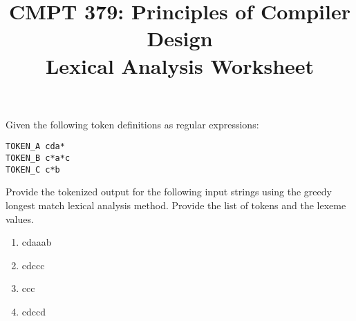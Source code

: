 \documentclass[10pt, oneside, letterpaper]{article}
\title{CMPT 379: Principles of Compiler Design \\\medskip \Large Lexical Analysis Worksheet}
\author{}
\date{}
\begin{document}
	\maketitle
	
	Given the following token definitions as regular expressions:
\begin{lstlisting}
TOKEN_A cda*
TOKEN_B c*a*c
TOKEN_C c*b
\end{lstlisting}
			
	Provide the tokenized output for the following input strings using the greedy longest match lexical analysis method. Provide the list of tokens and the lexeme values.
	
	\begin{enumerate}
		\item cdaaab
		\vspace{2cm}
		
		\item cdccc
		\vspace{2cm}
		
		\item ccc
		\vspace{2cm}
		
		\item cdccd
		\vspace{2cm}

	\end{enumerate}
		
	\vspace{2cm}
\end{document}
